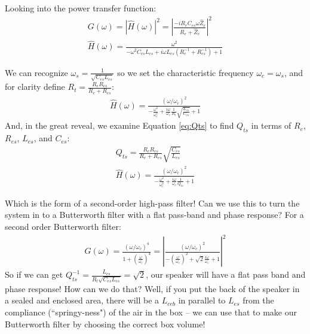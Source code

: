 \documentclass[10pt]{book}
\begin{document}
Looking into the power transfer function:
\begin{align}
G(\omega)=\left| \hat{H}(\omega)\right|^2 =\left| \frac{-iR_{e}C_{es}\omega  \hat{Z}_e }{ R_e+\hat{Z}_e} \right|^2\\
\hat{H}(\omega) =\frac{\omega^2}{-\omega^2 C_{es}L_{es}+i\omega L_{es}\left( R_e^{-1}+R_{es}^{-1} \right) +1}
\end{align}

We can recognize $\omega_s=\frac{1}{\sqrt{C_{es} L_{es}}}$ so we set the characteristic frequency $\omega_c=\omega_s$, and for clarity define $R_t=\frac{R_eR_{es}}{R_e+R_{es}}$:
\begin{align}
\hat{H}(\omega) =\frac{(\omega/\omega_c)^2}{-\frac{\omega^2}{\omega_c^2} +\frac{i \omega}{\omega_c}\frac{1}{R_t}\sqrt{\frac{ L_{es}}{C_{es}}} +1}\label{eq:freeair-transfer}
\end{align}
And, in the great reveal, we examine Equation \ref{eq:Qts} to find $Q_{ts}$ in terms of $R_{e}$, $R_{es}$, $L_{es}$, and $C_{es}$:
\begin{align}
Q_{ts}=\frac{R_e R_{es}}{R_e+R_{es}}\sqrt{\frac{C_{es}}{L_{es}}}\\
\hat{H}(\omega) =\frac{(\omega/\omega_c)^2}{-\frac{\omega^2}{\omega_c^2} +\frac{i \omega}{\omega_c}\frac{1}{Q_{ts}}+1}\label{eq:general_transfer_function}
\end{align}

Which is the form of a second-order high-pass filter! Can we use this to turn the system in to a Butterworth filter with a flat pass-band and phase response? For a second order Butterworth filter:
\begin{align}
G(\omega)=\frac{(\omega/\omega_c)^4}{1+\left( \frac{\omega}{\omega_c} \right)^4}=\left| \frac{(\omega/\omega_c)^2}{-\left(\frac{\omega}{\omega_c} \right)^2 +\sqrt{2}\frac{i\omega}{\omega_c} +1} \right|^2
\end{align}
So if we can get $Q_{ts}^{-1}=\frac{ L_{es}}{R_{t}\sqrt{C_{es}L_{es}}} =\sqrt{2}$, our speaker will have a flat pass band and phase response! How can we do that? Well, if you put the back of the speaker in a sealed and enclosed area, there will be a $L_{ceb}$ in parallel to $L_{es}$ from the compliance (``springy-ness") of the air in the box -- we can use that to make our Butterworth filter by choosing the correct box volume!
\end{document}
